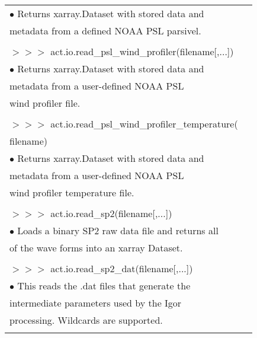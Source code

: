\documentclass[potrait, z1paper, fontscale=0.33]{baposter} %
\begin{document}
\begin{poster}
{\begin{flushleft}
\begin{tabular}{@{}ll@{}}
\-\hspace{0.2cm} $\bullet$ Returns xarray.Dataset with stored data and\\
\-\hspace{0.5cm} metadata from a defined NOAA PSL parsivel.\\
\\
$>$$>$$>$ act.io.read\_psl\_wind\_profiler(filename[,...])\\
\-\hspace{0.2cm} $\bullet$ Returns xarray.Dataset with stored data and\\
\-\hspace{0.5cm} metadata from a user-defined NOAA PSL\\
\-\hspace{0.5cm} wind profiler file.\\
\\
$>$$>$$>$ act.io.read\_psl\_wind\_profiler\_temperature(\\
\-\hspace{1.5cm} filename)\\
\-\hspace{0.2cm} $\bullet$ Returns xarray.Dataset with stored data and\\
\-\hspace{0.5cm} metadata from a user-defined NOAA PSL\\
\-\hspace{0.5cm} wind profiler temperature file.\\
\\
$>$$>$$>$ act.io.read\_sp2(filename[,...])\\
\-\hspace{0.2cm} $\bullet$ Loads a binary SP2 raw data file and returns all\\
\-\hspace{0.5cm} of the wave forms into an xarray Dataset.\\
\\
$>$$>$$>$ act.io.read\_sp2\_dat(filename[,...])\\
\-\hspace{0.2cm} $\bullet$ This reads the .dat files that generate the\\
\-\hspace{0.5cm} intermediate parameters used by the Igor\\
\-\hspace{0.5cm} processing. Wildcards are supported.\\
\\
\end{tabular}
\end{flushleft}

}

\end{poster}
\newpage
\end{document}
